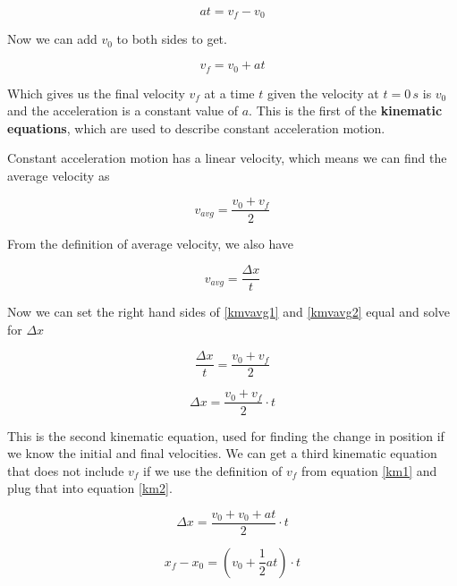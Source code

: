 \documentclass[12pt]{book}
\begin{document}
\begin{equation}
at = v_f - v_0
\end{equation}

Now we can add $v_0$ to both sides to get.

\begin{equation}
v_f = v_0 + at
\label{km1}
\end{equation}

Which gives us the final velocity $v_f$ at a time $t$ given the velocity at $t = 0 \, s$ is $v_0$ and the acceleration is a constant value of $a$. This is the first of the \textbf{kinematic equations}, which are used to describe constant acceleration motion.

Constant acceleration motion has a linear velocity, which means we can find the average velocity as 

\begin{equation}
v_{avg} = \frac{v_0 + v_f}{2}
\label{kmvavg1}
\end{equation}

From the definition of average velocity, we also have 

\begin{equation}
v_{avg} = \frac{\Delta x}{t}
\label{kmvavg2}
\end{equation}


Now we can set the right hand sides of \ref{kmvavg1} and \ref{kmvavg2} equal and solve for $\Delta x$

\begin{equation}
\frac{\Delta x}{t} = \frac{v_0 + v_f}{2}
\end{equation}

\begin{equation}
\Delta x = \frac{v_0 + v_f}{2} \cdot t
\label{km2}
\end{equation}

This is the second kinematic equation, used for finding the change in position if we know the initial and final velocities. We can get a third kinematic equation that does not include $v_f$ if we use the definition of $v_f$ from equation \ref{km1} and plug that into equation \ref{km2}.

\begin{equation}
\Delta x = \frac{v_0 + v_0 + at}{2} \cdot t
\end{equation}

\begin{equation}
x_f - x_0 =  (v_0 + \frac{1}{2}at) \cdot t
\end{equation}
\end{document}
